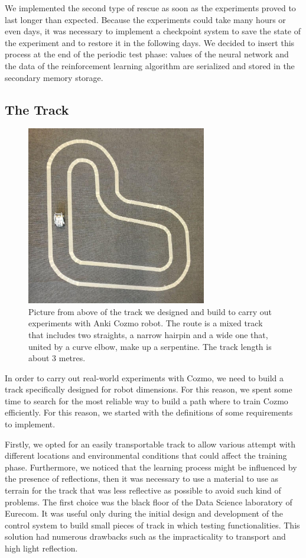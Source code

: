 We implemented the second type of rescue as soon as the experiments proved to last longer than expected.
Because the experiments could take many hours or even days, it was necessary to implement a checkpoint system to save the state of the experiment and to restore it in the following days.
We decided to insert this process at the end of the periodic test phase: values of the neural network and the data of the reinforcement learning algorithm are serialized and stored in the secondary memory storage.

\subsection{The Track}

\begin{figure}
    \centering
    \includegraphics[width=0.7\textwidth]{img/track.png}
    \caption[CozmoEnv Racing Track]{ Picture from above of the track we designed and build to carry out experiments with Anki Cozmo robot. The route is a mixed track that includes two straights, a narrow hairpin and a wide one that, united by a curve elbow, make up a serpentine. The track length is about 3 metres.}
    \label{fig:track_cozmo}
\end{figure}

In order to carry out real-world experiments with Cozmo, we need to build a track specifically designed for robot dimensions.
For this reason, we spent some time to search for the most reliable way to build a path where to train Cozmo efficiently.
For this reason, we started with the definitions of some requirements to implement.

Firstly, we opted for an easily transportable track to allow various attempt with different locations and environmental conditions that could affect the training phase.
Furthermore, we noticed that the learning process might be influenced by the presence of reflections, then it was necessary to use a material to use as terrain for the track that was less reflective as possible to avoid such kind of problems.
The first choice was the black floor of the Data Science laboratory of Eurecom.
It was useful only during the initial design and development of the control system to build small pieces of track in which testing functionalities.
This solution had numerous drawbacks such as the impracticality to transport and high light reflection.

